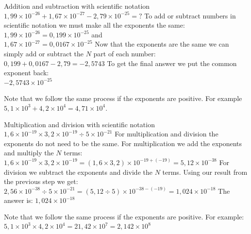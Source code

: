 \begin{wex}{Addition and subtraction with scientific notation}
 {\vspace{-.5cm} $1,99 \times 10^{-26} + 1,67 \times 10^{-27} - 2,79 \times 10^{-25} = ?$}
{
To add or subtract numbers in scientific notation we must make all the exponents the same:\\
$1,99 \times 10^{-26} = 0,199 \times 10^{-25}$ and\\
$1,67 \times 10^{-27} = 0,0167 \times 10^{-25}$
Now that the exponents are the same we can simply add or subtract the $N$ part of each number:\\
$0,199 + 0,0167 - 2,79 = -2,5743$ 
To get the final answer we put the common exponent back:\\
$-2,5743 \times 10^{-25}$
}
\end{wex}
Note that we follow the same process if the exponents are positive. For example $5,1 \times 10^{3} + 4,2 \times 10^{4} = 4,71 \times 10^{4}$. 
\begin{wex}{Multiplication and division with scientific notation}
 {$1,6 \times 10^{-19} \times 3,2 \times 10^{-19} \div 5 \times 10^{-21} $}
{ 
For multiplication and division the exponents do not need to be the same. For multiplication we add the exponents and multiply the $N$ terms:\\
$1,6 \times 10^{-19} \times 3,2 \times 10^{-19} = (1,6 \times 3,2) \times 10^{-19 + (-19)} = 5,12 \times 10^{-38}$
For division we subtract the exponents and divide the $N$ terms. Using our result from the previous step we get:\\
$2,56 \times 10^{-38} \div 5 \times 10^{-21} = (5,12 \div 5) \times 10^{-38 - (-19)} = 1,024 \times 10^{-18}$
The answer is: $1,024 \times 10^{-18}$
}
\end{wex}
Note that we follow the same process if the exponents are positive. For example: $5,1 \times 10^{3} \times 4,2 \times 10^{4} = 21,42 \times 10^{7} = 2,142 \times 10^{8}$
